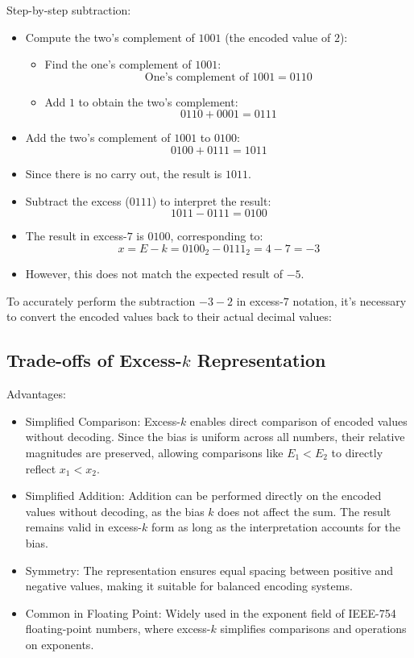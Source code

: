 Step-by-step subtraction:
\begin{itemize}
    \item Compute the two's complement of \( 1001 \) (the encoded value of \( 2 \)):
    \begin{itemize}[noitemsep, left=1.5cm]
        \item Find the one's complement of \( 1001 \):
        \[
        \text{One's complement of } 1001 = 0110
        \]
        \item Add \( 1 \) to obtain the two's complement:
        \[
        0110 + 0001 = 0111
        \]
    \end{itemize}
    \item Add the two's complement of \( 1001 \) to \( 0100 \):
    \[
    0100 + 0111 = 1011
    \]
    \item Since there is no carry out, the result is \( 1011 \).
    \item Subtract the excess (\( 0111 \)) to interpret the result:
    \[
    1011 - 0111 = 0100
    \]
    \item The result in excess-\( 7 \) is \( 0100 \), corresponding to:
    \[
    x = E - k = 0100_2 - 0111_2 = 4 - 7 = -3
    \]
    \item However, this does not match the expected result of \( -5 \).
\end{itemize}

To accurately perform the subtraction \( -3 - 2 \) in excess-\( 7 \) notation, it's necessary to convert the encoded values back to their actual decimal values:


\subsection{Trade-offs of Excess-\( k \) Representation}
Advantages:
\begin{itemize}[topsep=0pt]
    \item Simplified Comparison: Excess-\( k \) enables direct comparison of encoded values without decoding. Since the bias is uniform across all numbers, their relative magnitudes are preserved, allowing comparisons like \( E_1 < E_2 \) to directly reflect \( x_1 < x_2 \).
    \item Simplified Addition: Addition can be performed directly on the encoded values without decoding, as the bias \( k \) does not affect the sum. The result remains valid in excess-\( k \) form as long as the interpretation accounts for the bias.
    \item Symmetry: The representation ensures equal spacing between positive and negative values, making it suitable for balanced encoding systems.
    \item Common in Floating Point: Widely used in the exponent field of IEEE-754 floating-point numbers, where excess-\( k \) simplifies comparisons and operations on exponents.
\end{itemize}

